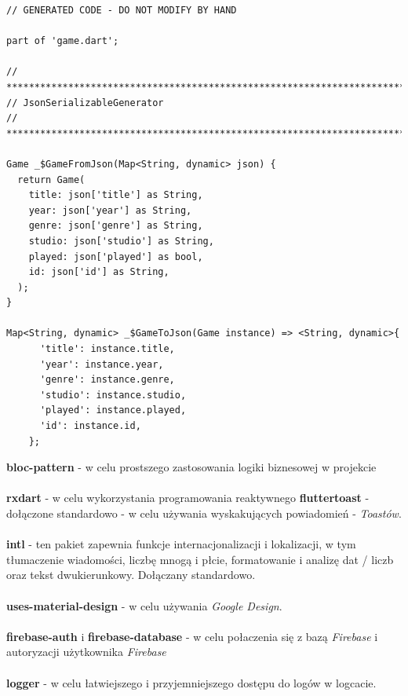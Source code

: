 \documentclass[12pt,a4paper]{article}
\begin{document}
\begin{verbatim}
// GENERATED CODE - DO NOT MODIFY BY HAND

part of 'game.dart';

// **************************************************************************
// JsonSerializableGenerator
// **************************************************************************

Game _$GameFromJson(Map<String, dynamic> json) {
  return Game(
    title: json['title'] as String,
    year: json['year'] as String,
    genre: json['genre'] as String,
    studio: json['studio'] as String,
    played: json['played'] as bool,
    id: json['id'] as String,
  );
}

Map<String, dynamic> _$GameToJson(Game instance) => <String, dynamic>{
      'title': instance.title,
      'year': instance.year,
      'genre': instance.genre,
      'studio': instance.studio,
      'played': instance.played,
      'id': instance.id,
    };

\end{verbatim}

\textbf{bloc-pattern} - w celu prostszego zastosowania logiki biznesowej w projekcie \\ \\
\textbf{rxdart} - w celu wykorzystania programowania reaktywnego 
\textbf{fluttertoast} - dołączone standardowo - w celu używania wyskakujących powiadomień - \textit{Toastów}. \\ \\
\textbf{intl} - ten pakiet zapewnia funkcje internacjonalizacji i lokalizacji, w tym tłumaczenie wiadomości, liczbę mnogą i płcie, formatowanie i analizę dat / liczb oraz tekst dwukierunkowy. Dołączany standardowo. \\ \\
\textbf{uses-material-design} - w celu używania \textit{Google Design}. \\ \\
\textbf{firebase-auth} i \textbf{firebase-database} - w celu połaczenia się z bazą \textit{Firebase} i autoryzacji użytkownika \textit{Firebase} \\ \\
\textbf{logger} - w celu łatwiejszego i przyjemniejszego dostępu do logów w logcacie.
    
\end{document}
